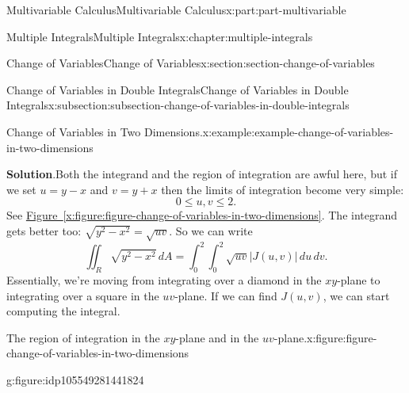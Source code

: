 \documentclass[twoside,10pt,]{book}
\newcommand{\blocktitlefont}{\relax}
\newcommand{\xreffont}{\relax}
\numberwithin{equation}{part}
\begin{document}
\begin{partptx}{Multivariable Calculus}{}{Multivariable Calculus}{}{}{x:part:part-multivariable}
\begin{chapterptx}{Multiple Integrals}{}{Multiple Integrals}{}{}{x:chapter:multiple-integrals}
\begin{sectionptx}{Change of Variables}{}{Change of Variables}{}{}{x:section:section-change-of-variables}
\begin{subsectionptx}{Change of Variables in Double Integrals}{}{Change of Variables in Double Integrals}{}{}{x:subsection:subsection-change-of-variables-in-double-integrals}
\begin{example}{Change of Variables in Two Dimensions.}{x:example:example-change-of-variables-in-two-dimensions}
\par\smallskip%
\noindent\textbf{\blocktitlefont Solution}.\hypertarget{g:solution:idp105549281436448}{}\quad{}Both the integrand and the region of integration are awful here, but if we set \(u = y - x\) and \(v = y + x\) then the limits of integration become very simple:%
\begin{equation*}
0 \leq u,v \leq 2\text{.}
\end{equation*}
See \hyperref[x:figure:figure-change-of-variables-in-two-dimensions]{Figure~{\xreffont\ref{x:figure:figure-change-of-variables-in-two-dimensions}}}. The integrand gets better too: \(\sqrt{y^{2} - x^{2}} = \sqrt{uv}\). So we can write%
\begin{equation*}
\iint_{R}\sqrt{y^{2} - x^{2}}\,dA = \int_{0}^{2}\int_{0}^{2}\sqrt{uv}|J(u,v)|\,du\,dv\text{.}
\end{equation*}
Essentially, we're moving from integrating over a diamond in the \(xy\)-plane to integrating over a square in the \(uv\)-plane. If we can find \(J(u,v)\), we can start computing the integral.%
\begin{figureptx}{The region of integration in the \(xy\)-plane and in the \(uv\)-plane.}{x:figure:figure-change-of-variables-in-two-dimensions}{}%
\begin{sidebyside}{2}{0}{0}{0}%
\begin{sbspanel}{0.5}%
\begin{subfigureptx}{}{g:figure:idp105549281441824}{}%
\end{subfigureptx}
\end{sbspanel}
\end{sidebyside}
\end{figureptx}
\end{example}
\end{subsectionptx}
\end{sectionptx}
\end{chapterptx}
\end{partptx}
\end{document}
